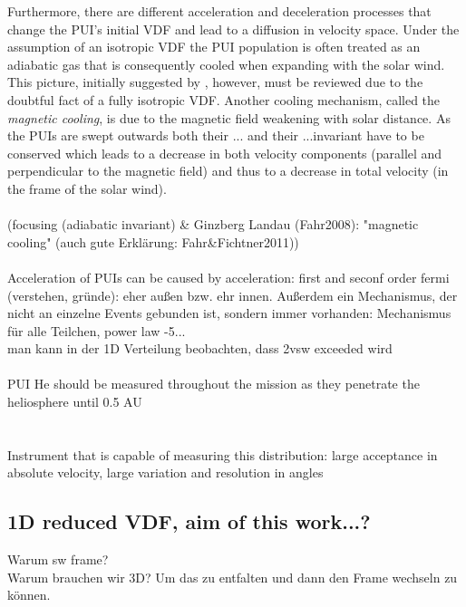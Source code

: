 Furthermore, there are different acceleration and deceleration processes that change the PUI's initial VDF and lead to a diffusion in velocity space.
Under the assumption of an isotropic VDF the PUI population is often treated as an adiabatic gas that is consequently cooled when expanding with the solar wind. This picture, initially suggested by \citet{vasyl_siscoe_1976}, however, must be reviewed due to the doubtful fact of a fully isotropic VDF.
Another cooling mechanism, called the \textit{magnetic cooling}, is due to the magnetic field weakening with solar distance. As the PUIs are swept outwards both their ... and their ...invariant have to be conserved which leads to a decrease in both velocity components (parallel and perpendicular to the magnetic field) and thus to a decrease in total velocity (in the frame of the solar wind).
\\ \\
(focusing (adiabatic invariant) \& Ginzberg Landau (Fahr2008): "magnetic cooling" (auch gute Erklärung: Fahr\&Fichtner2011))
\\ \\
Acceleration of PUIs can be caused by 
acceleration: first and seconf order fermi (verstehen, gründe): eher außen bzw. ehr innen. Außerdem ein Mechanismus, der nicht an einzelne Events gebunden ist, sondern immer vorhanden: Mechanismus für alle Teilchen, power law -5...\\
man kann in der 1D Verteilung beobachten, dass 2vsw exceeded wird
\\ \\
PUI He should be measured throughout the mission as they penetrate the heliosphere until 0.5 AU \citep{gloeckler_1992}
\\ \\ \\
Instrument that is capable of measuring this distribution: large acceptance in absolute velocity, large variation and resolution in angles
\subsection{1D reduced VDF, aim of this work...?}
Warum sw frame?\\
Warum brauchen wir 3D? Um das zu entfalten und dann den Frame wechseln zu können.